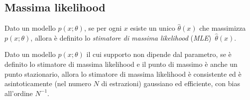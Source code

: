 \subsection{Massima likelihood}
\label{sec:ml}

\begin{definition}
	Dato un modello $p(x;\theta)$,
	se per ogni $x$ esiste un unico $\hat\theta(x)$ che massimizza $p(x;\theta)$,
	allora è definito lo \emph{stimatore di massima likelihood} (\emph{MLE})~$\hat\theta(x)$.
\end{definition}

\begin{theorem}
	\label{teo:mle}
	Dato un modello $p(x;\theta)$ il cui supporto non dipende dal parametro,
	se è definito lo stimatore di massima likelihood
	e il punto di massimo è anche un punto stazionario,
	allora lo stimatore di massima likelihood è consistente
	ed è asintoticamente (nel numero $N$ di estrazioni) gaussiano ed efficiente,
	con bias all'ordine $N^{-1}$.
\end{theorem}

